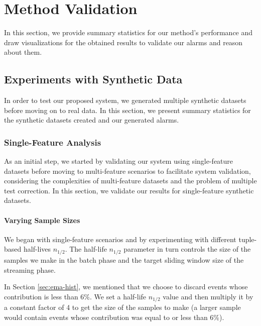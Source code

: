 \chapter{Method Validation} \label{chap:validation} \minitoc

In this section, we provide summary statistics for our method's performance and draw visualizations for the obtained results to validate our alarms and reason about them.

\section{Experiments with Synthetic Data}
In order to test our proposed system, we generated multiple synthetic datasets before moving on to real data. In this section, we present summary statistics for the synthetic datasets created and our generated alarms.

\subsection{Single-Feature Analysis}
As an initial step, we started by validating our system using single-feature datasets before moving to multi-feature scenarios to facilitate system validation, considering the complexities of multi-feature datasets and the problem of multiple test correction. In this section, we validate our results for single-feature synthetic datasets.

\subsubsection{Varying Sample Sizes}
We began with single-feature scenarios and by experimenting with different tuple-based half-lives $n_{1/2}$. The half-life $n_{1/2}$ parameter in turn controls the size of the samples we make in the batch phase and the target sliding window size of the streaming phase. 

In Section \ref{sec:ema-hist}, we mentioned that we choose to discard events whose contribution is less than 6\%. We set a half-life $n_{1/2}$ value and then multiply it by a constant factor of 4 to get the size of the samples to make (a larger sample would contain events whose contribution was equal to or less than 6\%). 

